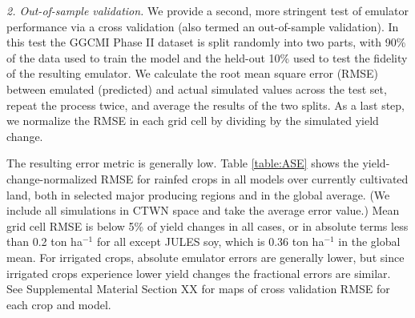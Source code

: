 \documentclass[gmd, manuscript]{copernicus} %
\begin{document}
\smallskip
\textit{2. Out-of-sample validation.} 
We provide a second, more stringent test of emulator performance via a cross validation (also termed an out-of-sample validation). 
In this test the GGCMI Phase II dataset is split randomly into two parts, with 90\% of the data used to train the model and the held-out 10\% used to test the fidelity of the resulting emulator.
We calculate the root mean square error (RMSE) between emulated (predicted) and actual simulated values across the test set, repeat the process twice, and average the results of the two splits. 
As a last step, we normalize the RMSE in each grid cell by dividing by the simulated yield change.

The resulting error metric is generally low.
Table \ref{table:ASE} shows the yield-change-normalized RMSE for rainfed crops in all models over currently cultivated land, both in selected major producing regions and in the global average. (We include all simulations in CTWN space and take the average error value.) 
Mean grid cell RMSE is below 5\% of yield changes in all cases, or in absolute terms 
less than 0.2 ton ha$^{-1}$ for all except JULES soy, which is 0.36 ton ha$^{-1}$ in the global mean.
For irrigated crops, absolute emulator errors are generally lower, but since irrigated crops experience lower yield changes the fractional errors are similar. 
See Supplemental Material Section XX for maps of cross validation RMSE for each crop and model.
\end{document}
